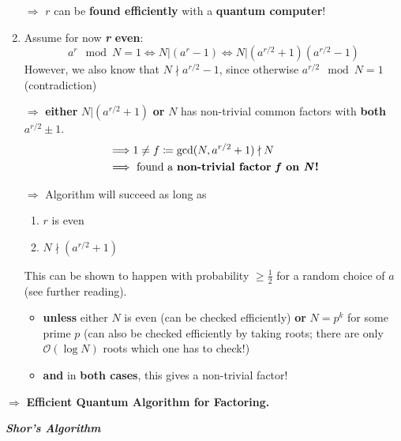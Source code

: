 \documentclass[a4paper, 12pt]{article}
\theoremstyle{plain}
\theoremstyle{definition}
\theoremstyle{remark}
\begin{document}
\begin{enumerate}[label=(\arabic*)]
    $\Longrightarrow$ $r$ can be \textbf{found efficiently} with a \textbf{quantum computer}!

  \item Assume for now \textbf{\emph{r} even}:
    \begin{equation*}
      a^r \mod N = 1 \Longleftrightarrow N|(a^r - 1) \Longleftrightarrow N|(a^{r/2}+1)(a^{r/2}-1)
    \end{equation*}
    However, we also know that $N \nmid a^{r/2}-1$, since otherwise $a^{r/2} \mod N = 1$ (contradiction)

    $\Longrightarrow$ \textbf{either} $N|(a^{r/2}+1)$ \textbf{or} $N$ has non-trivial common factors with \textbf{both} $a^{r/2} \pm 1$.
    \begin{align*}
      &\Longrightarrow 1 \neq f \coloneq \textnormal{gcd}(N,a^{r/2}+1) \nmid N\\
      &\Longrightarrow \text{ found a \textbf{non-trivial factor \emph{f} on \emph{N}!}}
    \end{align*}

    $\Longrightarrow$ Algorithm will succeed as long as
    \begin{enumerate}[label=(\roman*)]
      \item $r$ is even
      \item $N \nmid (a^{r/2}+1)$
    \end{enumerate}
    This can be shown to happen with probability $\geq \frac{1}{2}$ for a random choice of $a$ (see further reading).
    \begin{itemize}
      \item \textbf{unless} either $N$ is even (can be checked efficiently) \textbf{or} $N=p^k$ for some prime $p$ (can also be checked efficiently by taking roots; there are only $\mathcal{O}(\log N)$ roots which one has to check!)
      \item \textbf{and} in \textbf{both cases}, this gives a non-trivial factor!
    \end{itemize}
\end{enumerate}

$\Longrightarrow$ \textbf{Efficient Quantum Algorithm for Factoring.}

\begin{center}
  \textbf{\emph{Shor's Algorithm}}
\end{center}
\end{document}
